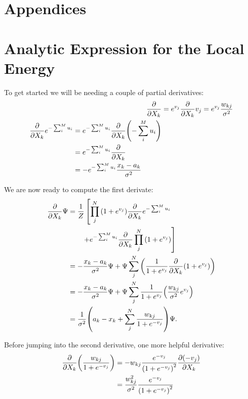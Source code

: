 \documentclass[a4paper, 11pt]{article}
\begin{document}
\pagebreak
\begin{multicols}{2}
    \appendix
    \section*{Appendices}

    \section{Analytic Expression for the Local Energy}
    \label{app:E-L-derivation}
    
    To get started we will be needing a couple of partial derivatives:
   \begin{align}
        \pdv{}{X_k} (1+e^{v_j}) &=e^{v_j}\pdv{}{X_k}v_j =
        e^{v_j} \frac{w_{kj}}{\sigma^2}\\
        \begin{split}
        \pdv{}{X_k}e^{-\sum_i^M u_i} &= e^{-\sum_i^M
        u_i}\pdv{}{X_k}\qty(-\sum_i^M u_i) \\
        &= e^{-\sum_i^M u_i}\pdv{}{X_k} (-u_k) \\
        &= -e^{-\sum_i^M u_i} \frac{x_k-a_k}{\sigma^2}
        \end{split}
    \end{align}

    We are now ready to compute the first derivate:
    \begin{align*}
        \pdv{}{X_k}\Psi &= \frac{1}{Z} \left[\prod_j^N
        \qty(1+e^{v_j})\pdv{}{X_k}e^{-\sum_i^M u_i}\right.\\
        &\quad{  }\quad{    }\left. + e^{-\sum_i^M
        u_i}\pdv{}{X_k} \prod_j^N \qty(1+e^{v_j})\right]\\
        &= -\frac{x_k-a_k}{\sigma^2}\Psi + \Psi \sum_j^N
        \qty(\frac{1}{1+e^{v_j}}\pdv{}{X_k}\qty(1+e^{v_j}))\\
        &= -\frac{x_k-a_k}{\sigma^2}\Psi + \Psi\sum_j^N
        \frac{1}{1+e^{v_j}}\qty(\frac{w_{kj}}{\sigma^2} e^{v_j})\\
        &= \frac{1}{\sigma^2}\qty(a_k-x_k + \sum_j^N
        \frac{w_{kj}}{1+e^{-v_j}})\Psi.
    \end{align*}

    Before jumping into the second derivative, one more helpful derivative:
    \begin{align}
        \begin{split}
        \pdv{}{X_k}\qty(\frac{w_{kj}}{1+e^{-v_j}}) &=
            -w_{kj}\frac{e^{-v_j}}{\qty(1+e^{-v_j})^2}\pdv{(-v_j)}{X_k}\\
        &= \frac{w_{kj}^2}{\sigma^2} \frac{e^{-v_j}}{\qty(1+e^{-v_j})^2}
        \end{split}
    \end{align}


\end{multicols}
\end{document}
